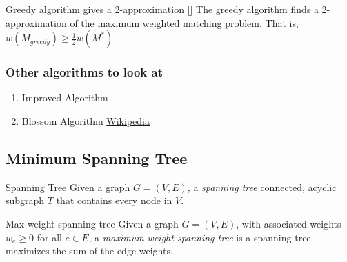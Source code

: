 \begin{theorem}{Greedy algorithm gives a 2-approximation [\cite{Avis83}]}{}
The greedy algorithm finds a 2-approximation of the maximum weighted matching problem.  That is, $w(M_{greedy}) \geq \tfrac{1}{2} w(M^*)$.
\end{theorem}


\subsubsection{Other algorithms to look at}
\begin{enumerate}
\item Improved  Algorithm \cite{DRAKE2003211}
\item Blossom Algorithm \href{https://en.wikipedia.org/wiki/Blossom_algorithm}{Wikipedia}
\end{enumerate}



\subsection{Minimum Spanning Tree}
\begin{definition}{Spanning Tree}{}
Given a graph $G = (V,E)$, a \emph{spanning tree} connected, acyclic subgraph $T$ that contains every node in $V$.
\end{definition}


\begin{definition}{Max weight spanning tree}{}
Given a graph $G = (V,E)$, with associated weights $w_e\geq 0$ for all $e \in E$, a \emph{maximum weight spanning tree} is a spanning tree maximizes the sum of the edge weights.
\end{definition}




